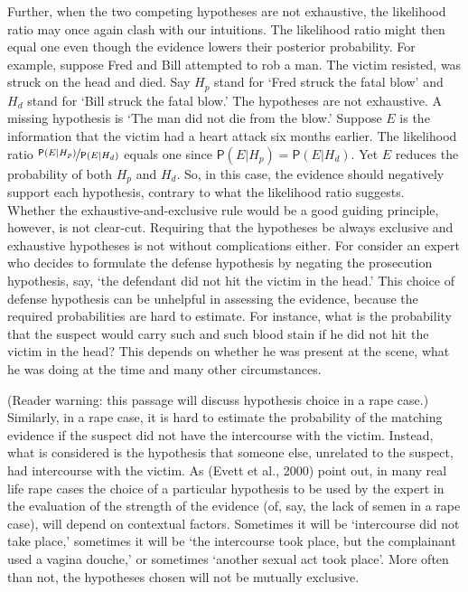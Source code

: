 \documentclass[10pt,dvipsnames,enabledeprecatedfontcommands]{scrartcl}
\newcommand{\pr}[1]{\mathsf{P}(#1)}
\begin{document}
Further, when the two competing hypotheses are not exhaustive, the
likelihood ratio may once again clash with our intuitions. The
likelihood ratio might then equal one even though the evidence lowers
their posterior probability. For example, suppose Fred and Bill
attempted to rob a man. The victim resisted, was struck on the head and
died. Say \(H_p\) stand for `Fred struck the fatal blow' and \(H_d\)
stand for `Bill struck the fatal blow.' The hypotheses are not
exhaustive. A missing hypothesis is `The man did not die from the blow.'
Suppose \(E\) is the information that the victim had a heart attack six
months earlier. The likelihood ratio
\(\nicefrac{\pr{E \vert H_p}}{\pr{E \vert H_d}}\) equals one since
\(\pr{E\vert H_p}=\pr{E\vert H_d}\). Yet \(E\) reduces the probability
of both \(H_p\) and \(H_d\). So, in this case, the evidence should
negatively support each hypothesis, contrary to what the likelihood
ratio suggests.\\
Whether the exhaustive-and-exclusive rule would be a good guiding
principle, however, is not clear-cut. Requiring that the hypotheses be
always exclusive and exhaustive hypotheses is not without complications
either. For consider an expert who decides to formulate the defense
hypothesis by negating the prosecution hypothesis, say, `the defendant
did not hit the victim in the head.' This choice of defense hypothesis
can be unhelpful in assessing the evidence, because the required
probabilities are hard to estimate. For instance, what is the
probability that the suspect would carry such and such blood stain if he
did not hit the victim in the head? This depends on whether he was
present at the scene, what he was doing at the time and many other
circumstances.

(Reader warning: this passage will discuss hypothesis choice in a rape
case.) Similarly, in a rape case, it is hard to estimate the probability
of the matching evidence if the suspect did not have the intercourse
with the victim. Instead, what is considered is the hypothesis that
someone else, unrelated to the suspect, had intercourse with the victim.
As (Evett et al., 2000) point out, in many real life rape cases the
choice of a particular hypothesis to be used by the expert in the
evaluation of the strength of the evidence (of, say, the lack of semen
in a rape case), will depend on contextual factors. Sometimes it will be
`intercourse did not take place,' sometimes it will be `the intercourse
took place, but the complainant used a vagina douche,' or sometimes
`another sexual act took place'. More often than not, the hypotheses
chosen will not be mutually exclusive.
\end{document}
